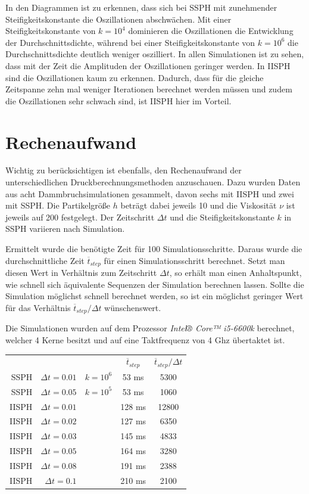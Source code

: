 \documentclass{scrreprt}
\begin{document}
In den Diagrammen ist zu erkennen, dass sich bei SSPH mit zunehmender Steifigkeitskonstante die Oszillationen abschwächen.
Mit einer Steifigkeitskonstante von $k = 10^4$ dominieren die Oszillationen die Entwicklung der Durchschnittsdichte,
während bei einer Steifigkeitskonstante von $k = 10^6$ die Durchschnittsdichte deutlich weniger oszilliert.
In allen Simulationen ist zu sehen, dass mit der Zeit die Amplituden der Oszillationen geringer werden.
In IISPH sind die Oszillationen kaum zu erkennen.
Dadurch, dass für die gleiche Zeitspanne zehn mal weniger Iterationen berechnet werden müssen und zudem die Oszillationen sehr schwach sind,
ist IISPH hier im Vorteil.


\section{Rechenaufwand}
Wichtig zu berücksichtigen ist ebenfalls, den Rechenaufwand der unterschiedlichen Druckberechnungsmethoden anzuschauen.
Dazu wurden Daten aus acht Dammbruchsimulationen gesammelt, davon sechs mit IISPH und zwei mit SSPH.
Die Partikelgröße $h$ beträgt dabei jeweils 10 und die Viskosität $\nu$ ist jeweils auf 200 festgelegt.
Der Zeitschritt $\Delta t$ und die Steifigkeitskonstante $k$ in SSPH variieren nach Simulation.

Ermittelt wurde die benötigte Zeit für 100 Simulationsschritte.
Daraus wurde die durchschnittliche Zeit $\overline{t}_{step}$ für einen Simulationsschritt berechnet.
Setzt man diesen Wert in Verhältnis zum Zeitschritt $\Delta t$, so erhält man einen Anhaltspunkt, wie schnell sich äquivalente Sequenzen der Simulation berechnen lassen.
Sollte die Simulation möglichst schnell berechnet werden, so ist ein möglichst geringer Wert für das Verhältnis $\overline{t}_{step} / \Delta t$ wünschenswert.

Die Simulationen wurden auf dem Prozessor \textit{Intel® Core™ i5-6600k} berechnet, welcher 4 Kerne besitzt und auf eine Taktfrequenz von 4 Ghz übertaktet ist.

\begin{center}
    \begin{tabular}{ r r r | c c }
        & & & $\overline{t}_{step}$ & $\overline{t}_{step} / \Delta t$\\
        SSPH & $\Delta t = 0.01$ & $k = 10^6$ & 53 ms & 5300\\
        SSPH & $\Delta t = 0.05$ & $k = 10^5$ & 53 ms & 1060\\
        IISPH & $\Delta t = 0.01$ & & 128 ms & 12800\\
        IISPH & $\Delta t = 0.02$ & & 127 ms & 6350\\
        IISPH & $\Delta t = 0.03$ & & 145 ms & 4833\\
        IISPH & $\Delta t = 0.05$ & & 164 ms & 3280\\
        IISPH & $\Delta t = 0.08$ & & 191 ms & 2388\\
        IISPH & $\Delta t = 0.1$ & & 210 ms & 2100\\
    \end{tabular}
\end{center}
\end{document}
